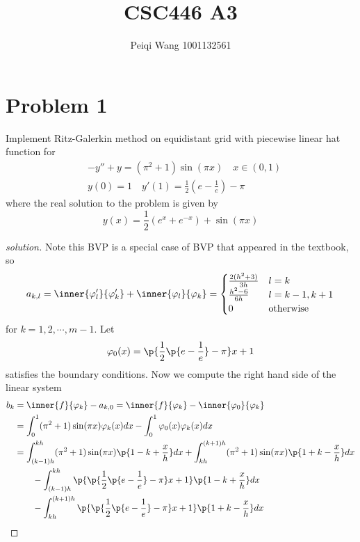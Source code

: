 \documentclass[11pt]{article}
\title{CSC446 A3}
\author{Peiqi Wang 1001132561}
\begin{document}
\maketitle


\section*{Problem 1} 
Implement Ritz-Galerkin method on equidistant grid with piecewise linear hat function for
\begin{align*}
    &-y'' + y = (\pi^2 + 1) \sin (\pi x) \quad x\in(0,1) \\
    &y(0) = 1\quad y'(1) = \frac{1}{2} (e-\frac{1}{e}) -\pi
\end{align*}
where the real solution to the problem is given by 
\[
    y(x) = \frac{1}{2} (e^x + e^{-x}) + \sin (\pi x)
\]
\begin{proof}[solution]
    Note this BVP is a special case of BVP that appeared in the textbook, so 
    \begin{align*}
        a_{k,l} 
        = \inner{\varphi_l'}{\varphi_k'} + \inner{\varphi_l}{\varphi_k}
        = \begin{cases}
            \frac{2(h^2+3)}{3h} & l=k \\
            \frac{h^2-6}{6h} & l = k-1,k+1 \\
            0 & \text{otherwise} \\
        \end{cases}
    \end{align*}
    for $k=1,2,\cdots, m-1$. Let 
    \[
        \varphi_0(x) = \p{\frac{1}{2} \p{e - \frac{1}{e}} - \pi} x  + 1
    \]
    satisfies the boundary conditions. Now we compute the right hand side of the linear system
    \begin{align*}
        b_k
        &= \inner{f}{\varphi_k} - a_{k,0} = \inner{f}{\varphi_k} - \inner{\varphi_0}{\varphi_k}\\
        &= \int_0^1 (\pi^2+1)\sin(\pi x) \varphi_k(x) dx 
            - \int_0^1 \varphi_0(x) \varphi_k(x) dx \\
        &= 
            \int_{(k-1)h}^{kh} (\pi^2 + 1) \sin(\pi x) \p{ 1-k+\frac{x}{h} } dx
            +\int_{kh}^{(k+1)h} (\pi^2+1) \sin(\pi x) \p{ 1+k-\frac{x}{h} } dx \\
        &\quad\quad -\int_{(k-1)h}^{kh} \p{\p{\frac{1}{2} \p{e - \frac{1}{e}} - \pi}x + 1} \p{ 1-k+\frac{x}{h}} dx \\
        &\quad\quad -\int_{kh}^{(k+1)h} \p{\p{\frac{1}{2} \p{e - \frac{1}{e}} - \pi}x + 1} \p{ 1+k-\frac{x}{h} } dx

\end{align*}
\end{proof}
\end{document}
